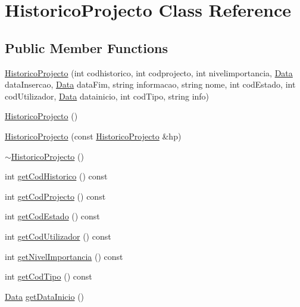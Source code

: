 \hypertarget{class_historico_projecto}{\section{Historico\-Projecto Class Reference}
\label{class_historico_projecto}
}
\subsection*{Public Member Functions}
\begin{DoxyCompactItemize}
\item 
\hyperlink{class_historico_projecto_aa3c4708c765d65e01f66426e2a2a5b2b}{Historico\-Projecto} (int codhistorico, int codprojecto, int nivelimportancia, \hyperlink{class_data}{Data} data\-Insercao, \hyperlink{class_data}{Data} data\-Fim, string informacao, string nome, int cod\-Estado, int cod\-Utilizador, \hyperlink{class_data}{Data} datainicio, int cod\-Tipo, string info)
\item 
\hyperlink{class_historico_projecto_aa6dc3f1f3699f6e37a3c3acc322a3209}{Historico\-Projecto} ()
\item 
\hyperlink{class_historico_projecto_a26e4896fe709c1c5f92394e3af362857}{Historico\-Projecto} (const \hyperlink{class_historico_projecto}{Historico\-Projecto} \&hp)
\item 
\hyperlink{class_historico_projecto_ac35a9235ffbd21f6cbc8372b32694f12}{$\sim$\-Historico\-Projecto} ()
\item 
int \hyperlink{class_historico_projecto_a340fbb98560e76e35df22dfd0ae2cb5d}{get\-Cod\-Historico} () const 
\item 
int \hyperlink{class_historico_projecto_a916072e50f369cedf6f43babf03b8401}{get\-Cod\-Projecto} () const 
\item 
int \hyperlink{class_historico_projecto_a3eb11bd92475c6d0ffd15d6843342573}{get\-Cod\-Estado} () const 
\item 
int \hyperlink{class_historico_projecto_a9e59c4d4ca554dd506236616ff5ebb2c}{get\-Cod\-Utilizador} () const 
\item 
int \hyperlink{class_historico_projecto_a029f9b13f6178f75ba4d233f79a33566}{get\-Nivel\-Importancia} () const 
\item 
int \hyperlink{class_historico_projecto_a5cc92000765806d78aad1139c180869b}{get\-Cod\-Tipo} () const 
\item 
\hyperlink{class_data}{Data} \hyperlink{class_historico_projecto_a8ebcbf707ca9d89862e2dec090917670}{get\-Data\-Inicio} ()

\end{DoxyCompactItemize}
